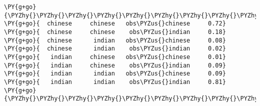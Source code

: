 \begin{example}
\begin{Verbatim}[commandchars=\\\{\}]
\PY{g+go}{\PYZhy{}\PYZhy{}\PYZhy{}\PYZhy{}\PYZhy{}\PYZhy{}\PYZhy{}\PYZhy{}\PYZhy{}\PYZhy{}\PYZhy{}\PYZhy{}\PYZhy{}\PYZhy{}\PYZhy{}\PYZhy{}\PYZhy{}\PYZhy{}\PYZhy{}\PYZhy{}\PYZhy{}\PYZhy{}\PYZhy{}\PYZhy{}\PYZhy{}\PYZhy{}\PYZhy{}\PYZhy{}\PYZhy{}\PYZhy{}\PYZhy{}\PYZhy{}\PYZhy{}\PYZhy{}\PYZhy{}\PYZhy{}\PYZhy{}\PYZhy{}\PYZhy{}\PYZhy{}\PYZhy{}\PYZhy{}\PYZhy{}\PYZhy{}\PYZhy{}\PYZhy{}\PYZhy{}\PYZhy{}\PYZhy{}\PYZhy{}}
\PY{g+go}{  chinese     chinese   obs\PYZus{}chinese     0.72}
\PY{g+go}{  chinese     chinese    obs\PYZus{}indian     0.18}
\PY{g+go}{  chinese      indian   obs\PYZus{}chinese     0.08}
\PY{g+go}{  chinese      indian    obs\PYZus{}indian     0.02}
\PY{g+go}{   indian     chinese   obs\PYZus{}chinese     0.01}
\PY{g+go}{   indian     chinese    obs\PYZus{}indian     0.09}
\PY{g+go}{   indian      indian   obs\PYZus{}chinese     0.09}
\PY{g+go}{   indian      indian    obs\PYZus{}indian     0.81}
\PY{g+go}{\PYZhy{}\PYZhy{}\PYZhy{}\PYZhy{}\PYZhy{}\PYZhy{}\PYZhy{}\PYZhy{}\PYZhy{}\PYZhy{}\PYZhy{}\PYZhy{}\PYZhy{}\PYZhy{}\PYZhy{}\PYZhy{}\PYZhy{}\PYZhy{}\PYZhy{}\PYZhy{}\PYZhy{}\PYZhy{}\PYZhy{}\PYZhy{}\PYZhy{}\PYZhy{}\PYZhy{}\PYZhy{}\PYZhy{}\PYZhy{}\PYZhy{}\PYZhy{}\PYZhy{}\PYZhy{}\PYZhy{}\PYZhy{}\PYZhy{}\PYZhy{}\PYZhy{}\PYZhy{}\PYZhy{}\PYZhy{}\PYZhy{}\PYZhy{}\PYZhy{}\PYZhy{}\PYZhy{}\PYZhy{}\PYZhy{}\PYZhy{}}

\end{Verbatim}
\caption{Násobení faktorů}
\label{lst:facmul}
\end{example}


